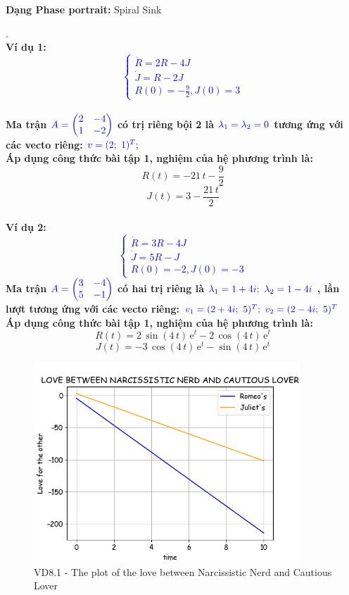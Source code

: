 \textbf{Dạng Phase portrait: } Spiral Sink
\pagebreak
\begin{tcbdoublebox}[title={8. Narcissistic Nerd and Cautious Lover}]
\mdseries .\\
\bfseries Ví dụ 1: \\
\textcolor{blue}{$$\left\{\begin{matrix}
\dot{R} =  2R -4J \\ 
\dot{J} =  R-2J\\ 
R(0)= -\frac{9}{2}, J(0)=3
\end{matrix}\right.$$}\\
\mdseries Ma trận $\color{blue}A=\begin{pmatrix}
2 & -4\\ 
1 & -2
\end{pmatrix}$ có trị riêng bội 2 là 
$\color{blue}\lambda_{1}=\lambda_{2}=0$ tương ứng với các vecto riêng:
$\color{blue}v = (2;\ 1)^{T};$\\Áp dụng công thức bài tập 1, nghiệm của hệ phương trình là:
$$R(t)=-21\,t-\frac{9}{2}$$
$$J(t)=3-\frac{21\,t}{2}$$
\\
\bfseries Ví dụ 2:\\
\textcolor{blue}{$$\left\{\begin{matrix}
\dot{R} = 3R -4J \\ 
\dot{J} =  5R -J\\ 
R(0)= -2, J(0)=-3
\end{matrix}\right.$$}
\mdseries Ma trận $\color{blue}A=\begin{pmatrix}
3 & -4\\ 
5 & -1
\end{pmatrix}$ có hai trị riêng là 
$\color{blue}\lambda_{1}=1+4i;\ \lambda_{2}=1-4i$
, lần lượt tương ứng với các vecto riêng:
$\color{blue}v_{1} = (2+4i;\ 5)^{T};\ v_{2}=(2-4i;\ 5)^{T}$\\Áp dụng công thức bài tập 1, nghiệm của hệ phương trình là:
$$R(t)=2\,\sin\left(4\,t\right)\,{\mathrm{e}}^t-2\,\cos\left(4\,t\right)\,{\mathrm{e}}^t$$
$$J(t)=-3\,\cos\left(4\,t\right)\,{\mathrm{e}}^t-\sin\left(4\,t\right)\,{\mathrm{e}}^t$$

\end{tcbdoublebox}
\pagebreak
\begin{figure}[!htbp]
    \centering
    \includegraphics[width=100mm]{image/bt2/plot8.1.png}
    \caption{VD8.1 - The plot of the love between Narcissistic Nerd and Cautious Lover}
\end{figure}
